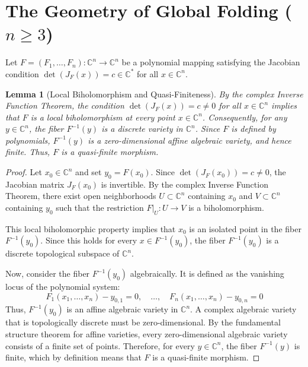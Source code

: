 \documentclass[11pt,reqno]{amsart}
\newtheorem{lemma}[theorem]{Lemma}
\theoremstyle{definition}
\begin{document}
\section{The Geometry of Global Folding ($n \ge 3$)}

Let $F = (F_1, \dots, F_n): \mathbb{C}^n \to \mathbb{C}^n$ be a polynomial mapping satisfying the Jacobian condition $\det(J_F(x)) = c \in \mathbb{C}^*$ for all $x \in \mathbb{C}^n$.


\begin{lemma}[Local Biholomorphism and Quasi-Finiteness]
By the complex Inverse Function Theorem, the condition $\det(J_F(x)) = c \neq 0$ for all $x \in \mathbb{C}^n$ implies that $F$ is a local biholomorphism at every point $x \in \mathbb{C}^n$. Consequently, for any $y \in \mathbb{C}^n$, the fiber $F^{-1}(y)$ is a discrete variety in $\mathbb{C}^n$. Since $F$ is defined by polynomials, $F^{-1}(y)$ is a zero-dimensional affine algebraic variety, and hence finite. Thus, $F$ is a quasi-finite morphism.
\end{lemma}

\begin{proof}
Let $x_0 \in \mathbb{C}^n$ and set $y_0 = F(x_0)$. Since $\det(J_F(x_0)) = c \neq 0$, the Jacobian matrix $J_F(x_0)$ is invertible. By the complex Inverse Function Theorem, there exist open neighborhoods $U \subset \mathbb{C}^n$ containing $x_0$ and $V \subset \mathbb{C}^n$ containing $y_0$ such that the restriction $F|_U: U \to V$ is a biholomorphism. 

This local biholomorphic property implies that $x_0$ is an isolated point in the fiber $F^{-1}(y_0)$. Since this holds for every $x \in F^{-1}(y_0)$, the fiber $F^{-1}(y_0)$ is a discrete topological subspace of $\mathbb{C}^n$.

Now, consider the fiber $F^{-1}(y_0)$ algebraically. It is defined as the vanishing locus of the polynomial system:
$$F_1(x_1, \dots, x_n) - y_{0,1} = 0, \quad \dots, \quad F_n(x_1, \dots, x_n) - y_{0,n} = 0$$
Thus, $F^{-1}(y_0)$ is an affine algebraic variety in $\mathbb{C}^n$. A complex algebraic variety that is topologically discrete must be zero-dimensional. By the fundamental structure theorem for affine varieties, every zero-dimensional algebraic variety consists of a finite set of points. Therefore, for every $y \in \mathbb{C}^n$, the fiber $F^{-1}(y)$ is finite, which by definition means that $F$ is a quasi-finite morphism.
\end{proof}
\end{document}

